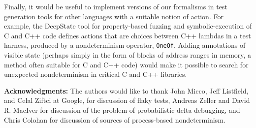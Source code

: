Finally, it would be useful to implement versions of our formalisms in
test generation tools for other languages with a suitable notion of
action.  For example, the DeepState
\cite{DeepState,DeepStateTutorial,deepstaterepo} tool for
property-based fuzzing and symbolic-execution of C and C++ code defines
actions that are choices between C++ lambdas in a test harness,
produced by a nondeterminism operator, {\tt OneOf}.
Adding annotations of visible state (perhaps simply in the form of
blocks of address ranges in memory, a method often suitable for C and
C++ code) would make it possible to search for unexpected nondeterminism in
critical C and C++ libraries.

{\scriptsize {\bf Acknowledgments:}  The authors would like to thank John Micco,
Jeff Listfield, and Celal Ziftci at Google, for discussion of
flaky tests, Andreas Zeller and David R. MacIver for discussion of the
problem of probabilistic delta-debugging, and Chris
Colohan for discussion of sources of process-based nondeterminism.}